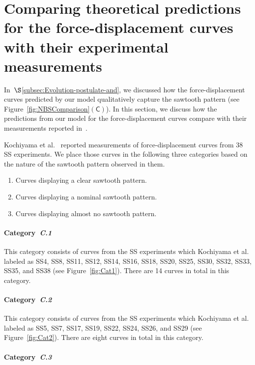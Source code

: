 \documentclass[preprint,10pt,times]{elsarticle}
\numberwithin{equation}{section}
\newcommand{\pr}[1]{\left( #1 \right)}
\newcommand{\subf}[1]{\pr{\textsf{#1}}}
\begin{document}
\section{Comparing theoretical predictions for the force-displacement curves
with their experimental measurements\label{sec:comparison}}

In~$\S$\ref{subsec:Evolution-postulate-and}, we discussed how the
force-displacement curves predicted by our model qualitatively capture
the sawtooth pattern (see Figure~\ref{fig:NBSComparison}$\subf{C}$).
In this section, we discuss how the predictions from our model for
the force-displacement curves compare with their measurements reported
in~\cite{Sayaka2021Sawtooth}.

Kochiyama et al.~\cite{Sayaka2021Sawtooth} reported measurements of force-displacement
curves from 38 SS experiments. We place those curves in the following
three categories based on the nature of the sawtooth pattern observed
in them.

\begin{enumerate}[label=\textit{C.\arabic*}]
\item  Curves displaying a clear sawtooth pattern.
\item  Curves displaying a nominal sawtooth pattern.
\item  Curves displaying almost no sawtooth pattern.
\end{enumerate}

\paragraph{Category~\textit{C.1}}

This category consists of curves from the SS experiments which Kochiyama
et al. labeled as SS4, SS8, SS11, SS12, SS14, SS16, SS18, SS20, SS25,
SS30, SS32, SS33, SS35, and SS38 (see Figure~\ref{fig:Cat1}). There
are 14 curves in total in this category.

\paragraph{Category~\textit{C.2}}

This category consists of curves from the SS experiments which Kochiyama
et al. labeled as SS5, SS7, SS17, SS19, SS22, SS24, SS26, and SS29
(see Figure~\ref{fig:Cat2}). There are eight curves in total in
this category.

\paragraph{Category~\textit{C.3}}
\end{document}
